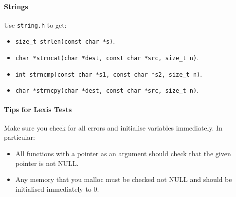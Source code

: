 \documentclass[twocolumn,english]{article}
\begin{document}
\paragraph{Strings}\label{strings}

Use \texttt{string.h} to get:

\begin{itemize}

\item
  \texttt{size\_t\ strlen(const\ char\ *s)}.
\item
  \texttt{char\ *strncat(char\ *dest,\ const\ char\ *src,\ size\_t\ n)}.
\item
  \texttt{int\ strncmp(const\ char\ *s1,\ const\ char\ *s2,\ size\_t\ n)}.
\item
  \texttt{char\ *strncpy(char\ *dest,\ const\ char\ *src,\ size\_t\ n)}.
\end{itemize}

\paragraph{Tips for Lexis Tests}\label{tips-for-lexis-tests}

Make sure you check for all errors and initialise variables immediately. In particular:
\begin{itemize}
\item All functions with a pointer as an argument should check that the given pointer is not NULL.
\item Any memory that you malloc must be checked not NULL and should be initialised immediately to 0.
\end{itemize}
\end{document}
